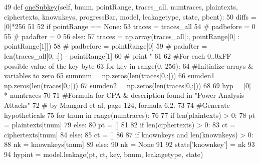 \begin{DoxyCode}
49     \textcolor{keyword}{def }\hyperlink{classsoftware_1_1chipwhisperer_1_1analyzer_1_1attacks_1_1cpa__algorithms_1_1simpleloop_1_1CPASimpleLoop_ad71ff1f2f64fa90b9d52c61b3b2dd3a3}{oneSubkey}(self, bnum, pointRange, traces\_all, numtraces, plaintexts, ciphertexts, 
      knownkeys, progressBar, model, leakagetype, state, pbcnt):
50         diffs = [0]*256
51 
52         \textcolor{keywordflow}{if} pointRange == \textcolor{keywordtype}{None}:
53             traces = traces\_all
54             \textcolor{comment}{# padbefore = 0}
55             \textcolor{comment}{# padafter = 0}
56         \textcolor{keywordflow}{else}:
57             traces = np.array(traces\_all[:, pointRange[0] : pointRange[1]])
58             \textcolor{comment}{# padbefore = pointRange[0]}
59             \textcolor{comment}{# padafter = len(traces\_all[0, :]) - pointRange[1]}
60             \textcolor{comment}{# print "%
61 
62         \textcolor{comment}{#For each 0..0xFF possible value of the key byte}
63         \textcolor{keywordflow}{for} key \textcolor{keywordflow}{in} range(0, 256):
64             \textcolor{comment}{#Initialize arrays & variables to zero}
65             sumnum = np.zeros(len(traces[0,:]))
66             sumden1 = np.zeros(len(traces[0,:]))
67             sumden2 = np.zeros(len(traces[0,:]))
68 
69             hyp = [0] * numtraces
70 
71             \textcolor{comment}{#Formula for CPA & description found in "Power Analysis Attacks"}
72             \textcolor{comment}{# by Mangard et al, page 124, formula 6.2.}
73 
74             \textcolor{comment}{#Generate hypotheticals}
75             \textcolor{keywordflow}{for} tnum \textcolor{keywordflow}{in} range(numtraces):
76 
77                 \textcolor{keywordflow}{if} len(plaintexts) > 0:
78                     pt = plaintexts[tnum]
79                 \textcolor{keywordflow}{else}:
80                     pt = []
81 
82                 \textcolor{keywordflow}{if} len(ciphertexts) > 0:
83                     ct = ciphertexts[tnum]
84                 \textcolor{keywordflow}{else}:
85                     ct = []
86 
87                 \textcolor{keywordflow}{if} knownkeys \textcolor{keywordflow}{and} len(knownkeys) > 0:
88                     nk = knownkeys[tnum]
89                 \textcolor{keywordflow}{else}:
90                     nk = \textcolor{keywordtype}{None}
91 
92                 state[\textcolor{stringliteral}{'knownkey'}] = nk
93 
94                 hypint = model.leakage(pt, ct, key, bnum, leakagetype, state)
}
\end{DoxyCode}
